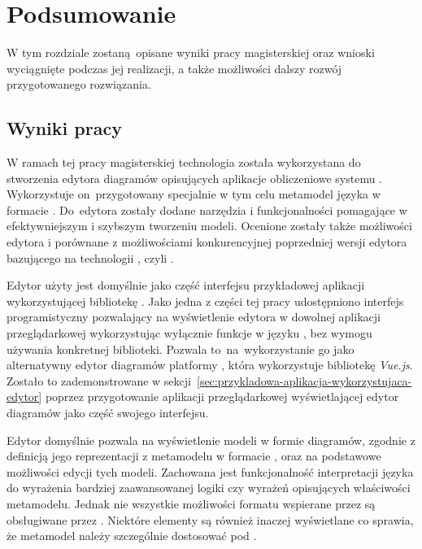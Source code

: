 \chapter{Podsumowanie}

W tym rozdziale zostaną opisane wyniki pracy magisterskiej oraz wnioski
wyciągnięte podczas jej realizacji, a także możliwości dalszy rozwój
przygotowanego rozwiązania.

\section{Wyniki pracy}

W ramach tej pracy magisterskiej technologia \SiriusWeb{} została
wykorzystana do stworzenia edytora diagramów opisujących aplikacje obliczeniowe
systemu \BalticLSC{}. Wykorzystuje on~przygotowany specjalnie w tym celu
metamodel języka \CAL{} w formacie \Ecore{}. Do~edytora zostały dodane
narzędzia i
funkcjonalności pomagające w efektywniejszym i szybszym tworzeniu modeli.
Ocenione zostały także możliwości edytora i porównane z możliwościami
konkurencyjnej poprzedniej wersji edytora bazującego na technologii \EMF{},
czyli \SiriusDesktop{}.

Edytor użyty jest domyślnie jako część interfejsu przykładowej aplikacji
wykorzystującej bibliotekę \React{}.
Jako jedna z części tej pracy udostępniono interfejs programistyczny
pozwalający na wyświetlenie edytora w dowolnej aplikacji przeglądarkowej
wykorzystując wyłącznie funkcje w języku \JavaScript{}, bez wymogu używania
konkretnej biblioteki.
Pozwala to~na~wykorzystanie go jako
alternatywny edytor diagramów platformy \BalticLSC{}, która wykorzystuje
bibliotekę \emph{Vue.js}. Zostało to
zademonstrowane w sekcji~\ref{sec:przykladowa-aplikacja-wykorzystujaca-edytor}
poprzez przygotowanie aplikacji przeglądarkowej wyświetlającej
edytor diagramów jako część swojego interfejsu.

Edytor domyślnie pozwala na wyświetlenie modeli w formie diagramów, zgodnie z
definicją jego reprezentacji z metamodelu w formacie \Ecore{}, oraz na
podstawowe możliwości
edycji tych modeli. Zachowana jest funkcjonalność interpretacji języka
 do wyrażenia bardziej zaawansowanej logiki czy wyrażeń
opisujących
właściwości metamodelu. Jednak nie wszystkie możliwości formatu \Ecore{}
wspierane przez \SiriusDesktop{} są obsługiwane przez \SiriusWeb{}.
Niektóre elementy są również inaczej wyświetlane co sprawia, że metamodel
należy szczególnie dostosować pod \SiriusWeb{}.

